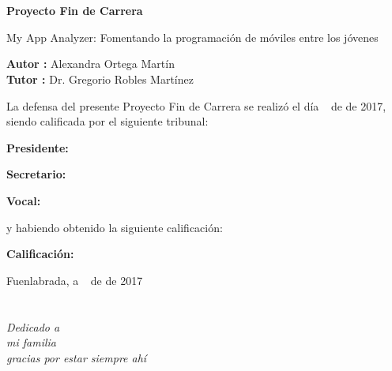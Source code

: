 \documentclass[a4paper, 12pt]{book}
\begin{document}
\newpage
\mbox{}
\thispagestyle{empty} %


\clearpage
{}
\chapter*{}

\vspace{-4cm}
\begin{center}
\LARGE
\textbf{Proyecto Fin de Carrera}

\vspace{1cm}
\large
My App Analyzer: Fomentando la programación de móviles entre los jóvenes

\vspace{1cm}
\large
\textbf{Autor :} Alexandra Ortega Martín \\
\textbf{Tutor :} Dr. Gregorio Robles Martínez

\end{center}

\vspace{1cm}
La defensa del presente Proyecto Fin de Carrera se realizó el día \qquad$\;\,$ de \qquad\qquad\qquad\qquad \newline de 2017, siendo calificada por el siguiente tribunal:


\vspace{0.5cm}
\textbf{Presidente:}

\vspace{1.2cm}
\textbf{Secretario:}

\vspace{1.2cm}
\textbf{Vocal:}


\vspace{1.2cm}
y habiendo obtenido la siguiente calificación:

\vspace{1cm}
\textbf{Calificación:}


\vspace{1cm}
\begin{flushright}
Fuenlabrada, a \qquad$\;\,$ de \qquad\qquad\qquad\qquad de 2017
\end{flushright}


\chapter*{}
\begin{flushright}
\textit{Dedicado a \\
mi familia \\
gracias por estar siempre ahí}
\end{flushright}
\end{document}
